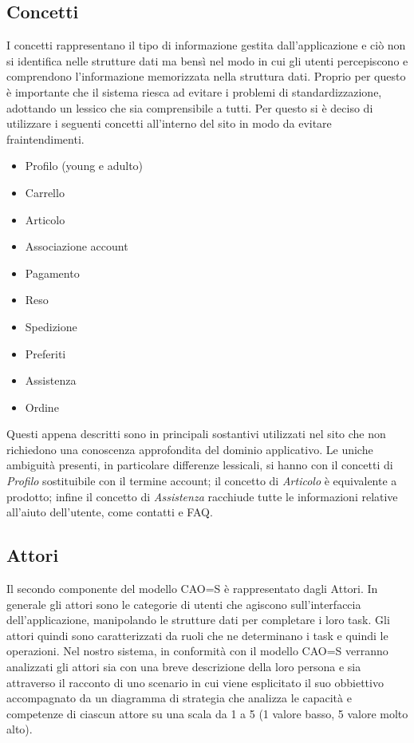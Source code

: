 \documentclass[12pt,a4paper]{report}
\begin{document}
\subsection{Concetti}
I concetti rappresentano il tipo di informazione gestita dall'applicazione e ciò non si identifica nelle strutture dati ma bensì nel modo in cui gli utenti percepiscono e comprendono l'informazione memorizzata nella struttura dati. Proprio per questo è importante che il sistema riesca ad evitare i problemi di standardizzazione, adottando un lessico che sia comprensibile a tutti. Per questo si è deciso di utilizzare i seguenti concetti all'interno del sito in modo da evitare fraintendimenti.
\begin{itemize}
  \item Profilo (young e adulto)
  \item Carrello
  \item Articolo
  \item Associazione account
  \item Pagamento
  \item Reso
  \item Spedizione
  \item Preferiti
  \item Assistenza
  \item Ordine
\end{itemize}
Questi appena descritti sono in principali sostantivi utilizzati nel sito che non richiedono una conoscenza approfondita del dominio applicativo. Le uniche ambiguità presenti, in particolare differenze lessicali, si hanno con il concetti di \textit{Profilo} sostituibile con il termine account; il concetto di \textit{Articolo} è equivalente a prodotto; infine il concetto di \textit{Assistenza} racchiude tutte le informazioni relative all'aiuto dell'utente, come contatti e FAQ.
\subsection{Attori}
Il secondo componente del modello CAO=S è rappresentato dagli Attori. In generale gli attori sono le categorie di utenti che agiscono sull'interfaccia dell'applicazione, manipolando le strutture dati per completare i loro task. Gli attori quindi sono caratterizzati da ruoli che ne determinano i task e quindi le operazioni. Nel nostro sistema, in conformità con il modello CAO=S verranno analizzati gli attori sia con una breve descrizione della loro persona e sia attraverso il racconto di uno scenario in cui viene esplicitato il suo obbiettivo accompagnato da un diagramma di strategia che analizza le capacità e competenze di ciascun attore su una scala da 1 a 5 (1 valore basso, 5 valore molto alto).\\
\newpage
\end{document}
